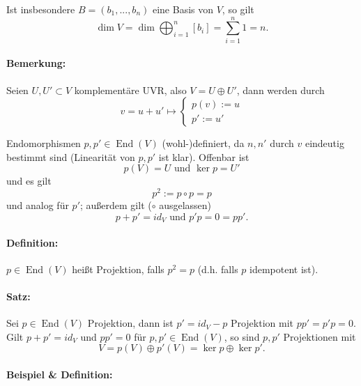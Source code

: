 	Ist insbesondere $ B=(b_1,...,b_n) $ eine Basis von $ V $, so gilt
		\begin{equation*}
		\dim V = \dim \bigoplus_{i=1}^n [b_i]=\sum_{i=1}^{n}1 = n.
		\end{equation*}
\paragraph{Bemerkung: }
	Seien $ U,U'\subset V $ komplementäre UVR, also $ V = U \oplus U' $, dann werden durch
		\begin{equation*}
		v = u+u' \mapsto
			\begin{cases}
			p(v):=u\\
			p':= u'
			\end{cases}
		\end{equation*}
	
	Endomorphismen $ p,p'\in \operatorname{End}(V) $ (wohl-)definiert, da $ n,n' $ durch $ v $ eindeutig bestimmt sind (Linearität von $ p,p' $ ist klar).
	Offenbar ist 
		\[ p(V) = U \text{ und } \ker p = U'\]
	und es gilt
		\[ p^2 := p\circ p = p \]
	und analog für $ p' $; außerdem gilt ($ \circ $ ausgelassen)
		\[ p+p' = id_V \text{ und } p'p = 0 = pp'.\]
		
\paragraph{Definition: }
	$ p\in \operatorname{End}(V) $ heißt Projektion, falls $ p^2 = p $ (d.h. falls $ p $ idempotent ist).
	
\paragraph{Satz: }
	Sei $ p\in \operatorname{End}(V) $ Projektion, dann ist $ p'= id_V-p $ Projektion mit $ pp' = p'p = 0 $. Gilt $ p+p' = id_V $ und $ pp' = 0 $ für $ p,p' \in \operatorname{End}(V) $, so sind $ p,p' $ Projektionen mit
		\[ V = p(V)\oplus p'(V) = \ker p \oplus \ker p'. \]
		
\paragraph{Beispiel \& Definition: }
